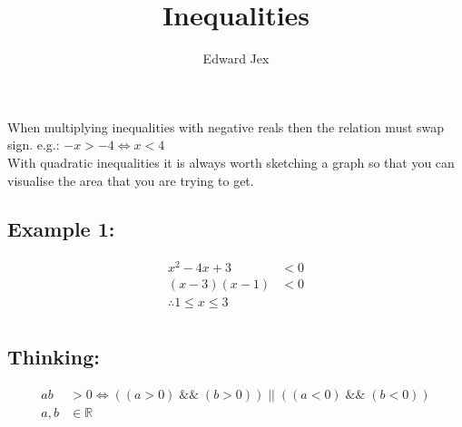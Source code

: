 \documentclass[a4paper,12pt]{article}
\begin{document}
\title{Inequalities}	
\author{Edward Jex}
\maketitle

When multiplying inequalities with negative reals then the relation must swap sign. e.g.: $-x > -4 \iff x < 4$
\\With quadratic inequalities it is always worth sketching a graph so that you can visualise the area that you are trying to get.
\subsection*{Example 1: }
\begin{align*}
x^2 -4x +3 & < 0 \\
(x-3)(x-1) & < 0 \\
\therefore 1 \leqslant x \leqslant 3&\\
\end{align*}

\subsection*{Thinking: }
\begin{align*}
ab & > 0 \iff ((a > 0)\;\&\&\;(b > 0))\;||\;((a < 0)\;\&\&\;(b < 0))\\
a,b & \in \mathbb{R}\\
\end{align*}
\end{document}

